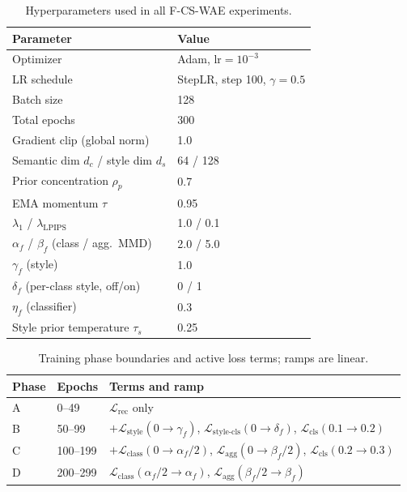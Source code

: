 \documentclass[letterpaper]{article}
\newcommand{\ours}{F-CS-WAE}
\begin{document}
\begin{table}[h]
\centering
\small
\caption{Hyperparameters used in all \ours{} experiments.}
\label{tab:hyperparameters}
\begin{tabular}{ll}
\toprule
Parameter & Value \\
\midrule
Optimizer & Adam, $\mathrm{lr}=10^{-3}$ \\
LR schedule & StepLR, step 100, $\gamma=0.5$ \\
Batch size & 128 \\
Total epochs & 300 \\
Gradient clip (global norm) & 1.0 \\
Semantic dim $d_c$ / style dim $d_s$ & 64 / 128 \\
Prior concentration $\rho_p$ & 0.7 \\
EMA momentum $\tau$ & 0.95 \\
$\lambda_1$ / $\lambda_{\mathrm{LPIPS}}$ & 1.0 / 0.1 \\
$\alpha_f$ / $\beta_f$ (class / agg.\ MMD) & 2.0 / 5.0 \\
$\gamma_f$ (style) & 1.0 \\
$\delta_f$ (per-class style, off/on) & 0 / 1 \\
$\eta_f$ (classifier) & 0.3 \\
Style prior temperature $\tau_s$ & 0.25 \\
\bottomrule
\end{tabular}
\end{table}

\begin{table}[h]
\centering
\scriptsize
\setlength{\tabcolsep}{2pt}
\caption{Training phase boundaries and active loss terms; ramps are linear.}
\label{tab:schedule}
\begin{tabular}{lll}
\toprule
Phase & Epochs & Terms and ramp \\
\midrule
A & 0--49   & $\mathcal{L}_{\mathrm{rec}}$ only \\
B & 50--99  & $+\mathcal{L}_{\mathrm{style}}(0{\to}\gamma_f)$,
              $\mathcal{L}_{\mathrm{style\text{-}cls}}(0{\to}\delta_f)$,
              $\mathcal{L}_{\mathrm{cls}}(0.1{\to}0.2)$ \\
C & 100--199 & $+\mathcal{L}_{\mathrm{class}}(0{\to}\alpha_f/2)$,
               $\mathcal{L}_{\mathrm{agg}}(0{\to}\beta_f/2)$,
               $\mathcal{L}_{\mathrm{cls}}(0.2{\to}0.3)$ \\
D & 200--299 & $\mathcal{L}_{\mathrm{class}}(\alpha_f/2{\to}\alpha_f)$,
               $\mathcal{L}_{\mathrm{agg}}(\beta_f/2{\to}\beta_f)$ \\
\bottomrule
\end{tabular}
\end{table}
\end{document}
